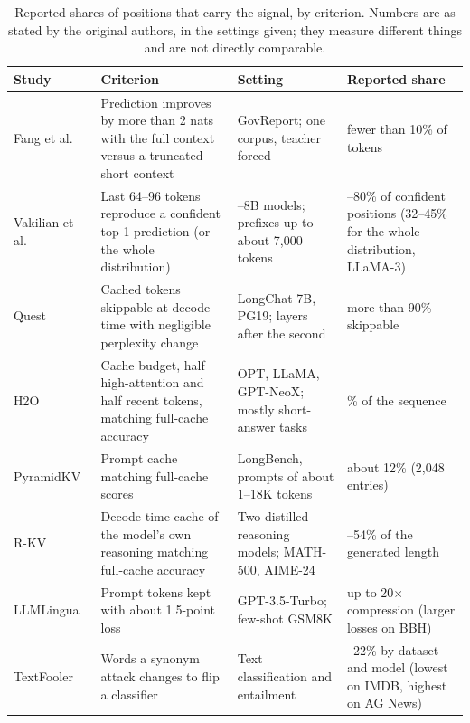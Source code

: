 \documentclass{ieeeaccess}
\newcommand{\rowgap}{\addlinespace[2.5pt]}
\begin{document}
\begin{table}[!t]
\caption{Reported shares of positions that carry the signal, by criterion. Numbers are as stated by the original authors, in the settings given; they measure different things and are not directly comparable.}
\label{tab:importance}
\centering
\footnotesize
\begin{tabular}{@{}>{\raggedright\arraybackslash}p{2.6cm}>{\raggedright\arraybackslash}p{5.0cm}>{\raggedright\arraybackslash}p{5.0cm}>{\raggedright\arraybackslash}p{3.9cm}@{}}
\toprule
\textbf{Study} & \textbf{Criterion} & \textbf{Setting} & \textbf{Reported share} \\
\midrule
Fang et al.~\cite{fang2024what} & Prediction improves by more than 2 nats with the full context versus a truncated short context & GovReport; one corpus, teacher forced & fewer than 10\% of tokens \\
\rowgap Vakilian et al.~\cite{vakilian2025short} & Last 64--96 tokens reproduce a confident top-1 prediction (or the whole distribution) & 7--8B models; prefixes up to about 7{,}000 tokens & 75--80\% of confident positions (32--45\% for the whole distribution, LLaMA-3) \\
\rowgap Quest~\cite{tang2024quest} & Cached tokens skippable at decode time with negligible perplexity change & LongChat-7B, PG19; layers after the second & more than 90\% skippable \\
\rowgap H2O~\cite{zhang2023h2o} & Cache budget, half high-attention and half recent tokens, matching full-cache accuracy & OPT, LLaMA, GPT-NeoX; mostly short-answer tasks & 20\% of the sequence \\
\rowgap PyramidKV~\cite{cai2024pyramidkv} & Prompt cache matching full-cache scores & LongBench, prompts of about 1--18K tokens & about 12\% (2{,}048 entries) \\
\rowgap R-KV~\cite{cai2025rkv} & Decode-time cache of the model's own reasoning matching full-cache accuracy & Two distilled reasoning models; MATH-500, AIME-24 & 10--54\% of the generated length \\
\rowgap LLMLingua~\cite{jiang2023llmlingua} & Prompt tokens kept with about 1.5-point loss & GPT-3.5-Turbo; few-shot GSM8K & up to 20$\times$ compression (larger losses on BBH) \\
\rowgap TextFooler~\cite{jin2020textfooler} & Words a synonym attack changes to flip a classifier & Text classification and entailment & 3.5--22\% by dataset and model (lowest on IMDB, highest on AG News) \\
\bottomrule
\end{tabular}
\end{table}
\end{document}
